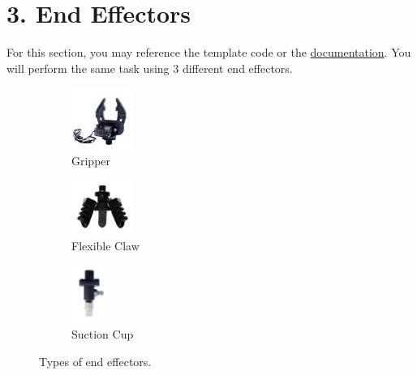 \newpage
\section*{3. End Effectors}

For this section, you may reference the template code or the \href{https://document.wlkata.com/?doc=/wlkata-mirobot-resources-for-education/python-sdk/#header-step-8npsc}{documentation}.
You will perform the same task using 3 different end effectors.
%
\begin{figure}[h!]
    \centering
    \begin{subfigure}[b]{0.27\textwidth}
        \includegraphics[width=2cm]{image/gripper.png}
        \caption*{Gripper}
    \end{subfigure}
    \hfill
    \begin{subfigure}[b]{0.27\textwidth}
        \includegraphics[width=2cm]{image/3finger.png}
        \caption*{Flexible Claw}
    \end{subfigure}
    \hfill
    \begin{subfigure}[b]{0.27\textwidth}
    \includegraphics[width=1.2cm]{image/suction cup.png}
    \caption*{Suction Cup}
    \end{subfigure}
    \caption*{Types of end effectors.}
\end{figure}

